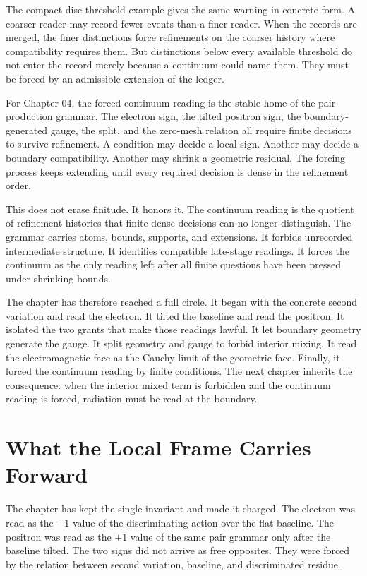 The compact-disc threshold example gives the same warning in concrete form.
A coarser reader may record fewer events than a finer reader. When the
records are merged, the finer distinctions force refinements on the coarser
history where compatibility requires them. But distinctions below every
available threshold do not enter the record merely because a continuum could
name them. They must be forced by an admissible extension of the ledger.

For Chapter 04, the forced continuum reading is the stable home of the
pair-production grammar. The electron sign, the tilted positron sign, the
boundary-generated gauge, the split, and the zero-mesh relation all require
finite decisions to survive refinement. A condition may decide a local sign.
Another may decide a boundary compatibility. Another may shrink a geometric
residual. The forcing process keeps extending until every required decision
is dense in the refinement order.

This does not erase finitude. It honors it. The continuum reading is the
quotient of refinement histories that finite dense decisions can no longer
distinguish. The grammar carries atoms, bounds, supports, and extensions. It
forbids unrecorded intermediate structure. It identifies compatible
late-stage readings. It forces the continuum as the only reading left after
all finite questions have been pressed under shrinking bounds.

The chapter has therefore reached a full circle. It began with the concrete
second variation and read the electron. It tilted the baseline and read the
positron. It isolated the two grants that make those readings lawful. It let
boundary geometry generate the gauge. It split geometry and gauge to forbid
interior mixing. It read the electromagnetic face as the Cauchy limit of the
geometric face. Finally, it forced the continuum reading by finite
conditions. The next chapter inherits the consequence: when the interior
mixed term is forbidden and the continuum reading is forced, radiation must
be read at the boundary.

\section{What the Local Frame Carries Forward}

The chapter has kept the single invariant and made it charged. The electron
was read as the \(-1\) value of the discriminating action over the flat
baseline. The positron was read as the \(+1\) value of the same pair grammar
only after the baseline tilted. The two signs did not arrive as free
opposites. They were forced by the relation between second variation,
baseline, and discriminated residue.

